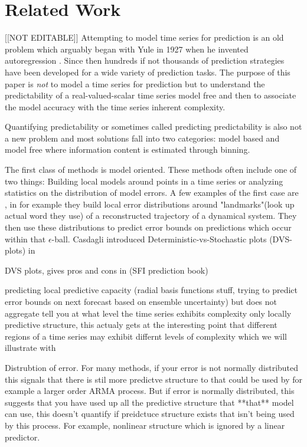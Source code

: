 \section{Related Work }\label{sec:related}
{\color{red}[[NOT EDITABLE]]}
Attempting to model time series for prediction is an  old problem which arguably began with Yule in 1927 when he invented autoregression \cite{Yule27}. Since then hundreds if not thousands of prediction strategies have been developed for a wide variety of prediction tasks. The purpose of this paper is \emph{not} to model a time series for prediction but to understand the predictability of a real-valued-scalar time series model free and then to associate the model accuracy with the time series inherent complexity. 

Quantifying predictability or sometimes called predicting predictability is also not a new problem and most solutions fall into two categories: model based and model free where information content is estimated through binning. 

The first class of methods is model oriented. These methods often include one of two things: Building local  models around points in a time series or analyzing statistics on the distribution of model errors. A few examples of the first case are \cite{Smith199250,Casdagli92dvsplots}, in \cite{Smith199250} for example they build local error distributions around "landmarks"(look up actual word they use) of a reconstructed trajectory of a dynamical system. They then use these distributions to predict error bounds on  predictions which occur within that $\epsilon$-ball. Casdagli introduced Deterministic-vs-Stochastic plots (DVS-plots) in \cite{Casdagli92dvsplots} 


DVS plots, gives pros and cons in (SFI prediction book)

predicting local predictive capacity (radial basis functions stuff, trying to predict error bounds on next forecast based on ensemble uncertainty) but does not aggregate tell you at what level the time series exhibits complexity only locally predictive structure, this actualy gets at the interesting point that different regions of a time series may exhibit differnt levels of complexity which we will illustrate with \svd

Distrubtion of error. For many methods, if your error is not normally distributed this signals that there is stil more predictve structure to that could be used by for example a larger order ARMA process. But if error is normally distributed, this suggests that you have used up all the predictive structure that **that** model can use, this doesn't quantify if preidctuce structure exists that isn't being used by this process. For example, nonlinear structure which is ignored by a linear predictor.





